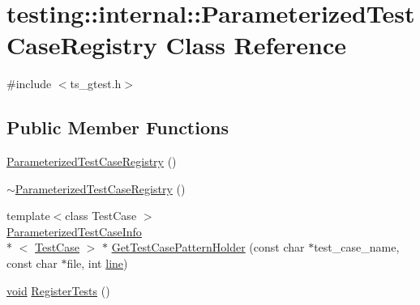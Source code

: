 \hypertarget{classtesting_1_1internal_1_1ParameterizedTestCaseRegistry}{\section{testing\-:\-:internal\-:\-:Parameterized\-Test\-Case\-Registry Class Reference}
\label{classtesting_1_1internal_1_1ParameterizedTestCaseRegistry}
}


{\ttfamily \#include $<$ts\-\_\-gtest.\-h$>$}

\subsection*{Public Member Functions}
\begin{DoxyCompactItemize}
\item 
\hyperlink{classtesting_1_1internal_1_1ParameterizedTestCaseRegistry_aacafaaf78ca09bbd9f5eed93ae2b6225}{Parameterized\-Test\-Case\-Registry} ()
\item 
\hyperlink{classtesting_1_1internal_1_1ParameterizedTestCaseRegistry_a695c86db8545a3745873190b91a13c9f}{$\sim$\-Parameterized\-Test\-Case\-Registry} ()
\item 
{\footnotesize template$<$class Test\-Case $>$ }\\\hyperlink{classtesting_1_1internal_1_1ParameterizedTestCaseInfo}{Parameterized\-Test\-Case\-Info}\\*
$<$ \hyperlink{classtesting_1_1TestCase}{Test\-Case} $>$ $\ast$ \hyperlink{classtesting_1_1internal_1_1ParameterizedTestCaseRegistry_af81b3fffa8c9a26256417b85aceb9e80}{Get\-Test\-Case\-Pattern\-Holder} (const char $\ast$test\-\_\-case\-\_\-name, const char $\ast$file, int \hyperlink{legacy_8hpp_a5a869825573cfaf8861a6ec0fe0f262f}{line})
\item 
\hyperlink{legacy_8hpp_a8bb47f092d473522721002c86c13b94e}{void} \hyperlink{classtesting_1_1internal_1_1ParameterizedTestCaseRegistry_ad5b63c8fe94f3d51d039a76c001c9223}{Register\-Tests} ()
\end{DoxyCompactItemize}


